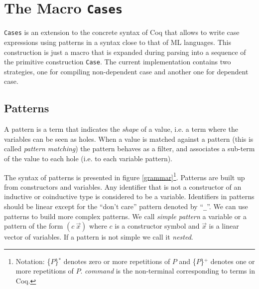 

%

%
%
\chapter{The Macro {\tt Cases}}\label{Cases}

\marginparwidth 0pt \oddsidemargin 0pt \evensidemargin 0pt \marginparsep 0pt
\topmargin 0pt \textwidth 6.5in \textheight 8.5in


\verb+Cases+ is an extension to the concrete syntax of Coq that allows
to write case expressions using patterns in a syntax close to that of ML languages.  
This construction is just a  macro that is
expanded during parsing into a sequence of the primitive construction 
 \verb+Case+.
The current implementation contains two strategies, one for compiling
non-dependent case and another one for dependent case.
\section{Patterns}\label{implementation}
A pattern is a term that indicates the {\em shape} of a value, i.e. a
term where the variables can be seen as holes. When a value is 
matched against a pattern (this is called {\em pattern matching}) 
the pattern behaves as a filter, and associates a sub-term  of the value
to each hole (i.e. to each variable pattern). 
 

The syntax of patterns is presented in  figure \ref{grammar}\footnote{
Notation:  \{$P$\}$^*$ denotes zero or more repetitions of $P$ and 
 \{$P$\}$^+$ denotes  one or more repetitions of $P$. {\sl command} is the
non-terminal corresponding to terms in Coq.}.
Patterns are built up from constructors and variables. Any identifier
that is not a constructor of an inductive or coinductive type is
considered to be 
a variable. Identifiers in patterns should be linear except for 
the ``don't care''  pattern denoted by ``\verb+_+''.
We can use patterns to build more complex patterns. 
We call {\em simple pattern} a variable  or a pattern of the form
$(c~\vec{x})$ where $c$ is a constructor symbol and $\vec{x}$ is a
linear vector of  variables. If a pattern is
not simple we call it {\em nested}.  


